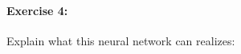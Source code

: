 \documentclass[fleqn,a4paper,11pt]{article}
\newcounter{num}
\begin{document}
%
% 
% 
% 
% 
% 
% 
% 
% 
% 

\vspace{2em} %

\paragraph{Exercise 4: }
Explain what this neural network can realizes: 
\end{document}
